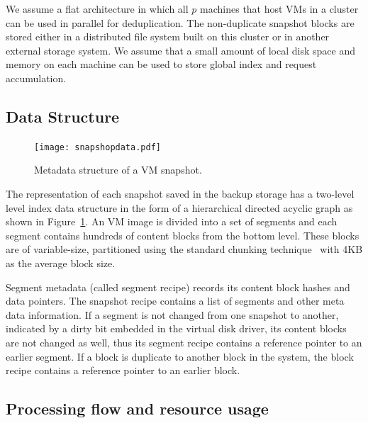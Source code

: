 We assume a flat architecture in which  all $p$ machines that host VMs in a cluster can 
be used in parallel for deduplication. 
The non-duplicate snapshot blocks are stored either in a distributed file system built on
this cluster  or in another  external storage system. 
We assume that  a small amount of local disk space and memory on each machine can be used 
to store global index and request accumulation.


\subsection{Data Structure}

\begin{figure}
\centering
\texttt{[image: snapshopdata.pdf]}
\caption{ Metadata structure of a VM snapshot.}
\label{fig:snapshot}
\end{figure}

The representation of each snapshot saved in the backup storage
has a two-level level index data structure in the form of a hierarchical
directed acyclic graph as shown in Figure~\ref{fig:snapshot}.
An VM image is divided into a set of segments and each  segment contains hundreds of content blocks from the bottom level.
These blocks are of variable-size, partitioned using
the standard chunking technique~\cite{similar94} with 4KB as the average block size. 

Segment metadata (called segment recipe) records its  content block hashes and data pointers. 
The snapshot recipe contains a list of segments and other meta data information.
If a segment is not changed from one snapshot to another, indicated by a dirty bit embedded in the virtual disk driver, 
its content blocks are not changed as well, thus its segment recipe contains a reference pointer to an earlier segment.
If a block is duplicate to another block in the system,  the block recipe contains a reference pointer to an earlier block.


\subsection{Processing flow and resource usage}

